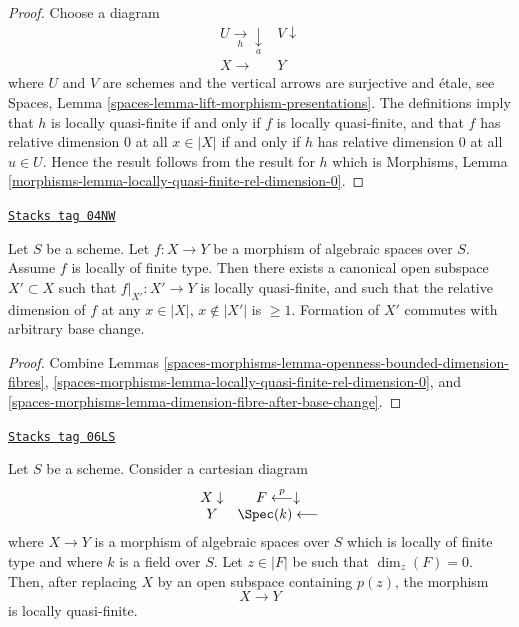 \begin{proof}
Choose a diagram
$$
\begin{array}{cc}U \underset{h}{\longrightarrow}\underset{a}{\downarrow} & V \downarrow \\ X \longrightarrow & Y\end{array}
$$
where $U$ and $V$ are schemes and the vertical arrows are surjective and
\'etale, see
Spaces, Lemma \ref{spaces-lemma-lift-morphism-presentations}.
The definitions imply that
$h$ is locally quasi-finite if and only if $f$ is locally quasi-finite,
and that $f$ has relative dimension $0$ at all $x \in |X|$ if and
only if $h$ has relative dimension $0$ at all $u \in U$.
Hence the result follows from the result for $h$ which is
Morphisms, Lemma \ref{morphisms-lemma-locally-quasi-finite-rel-dimension-0}.
\end{proof}

\begin{lemma}
\label{spaces-morphisms-lemma-locally-finite-type-quasi-finite-part}
\href{https://stacks.math.columbia.edu/tag/04NW}{\texttt{Stacks tag 04NW}}

Let $S$ be a scheme.
Let $f : X \to Y$ be a morphism of algebraic spaces over $S$.
Assume $f$ is locally of finite type.
Then there exists a canonical open subspace $X' \subset X$ such that
$f|_{X'} : X' \to Y$ is locally quasi-finite, and such that the
relative dimension of $f$ at any $x \in |X|$, $x \not \in |X'|$ is
$\geq 1$. Formation of $X'$ commutes with arbitrary base change.
\end{lemma}

\begin{proof}
Combine
Lemmas \ref{spaces-morphisms-lemma-openness-bounded-dimension-fibres},
\ref{spaces-morphisms-lemma-locally-quasi-finite-rel-dimension-0}, and
\ref{spaces-morphisms-lemma-dimension-fibre-after-base-change}.
\end{proof}

\begin{lemma}
\label{spaces-morphisms-lemma-quasi-finite-at-point}
\href{https://stacks.math.columbia.edu/tag/06LS}{\texttt{Stacks tag 06LS}}

Let $S$ be a scheme. Consider a cartesian diagram
$$
\begin{array}{cc}X \downarrow & F \overset{p}{\longleftarrow}\downarrow \\ Y & \Spec(k) \longleftarrow\end{array}
$$
where $X \to Y$ is a morphism of algebraic spaces over $S$ which is
locally of finite type and where $k$ is a field over $S$.
Let $z \in |F|$ be such that $\dim_z(F) = 0$. Then, after replacing $X$
by an open subspace containing $p(z)$, the morphism
$$
X \longrightarrow Y
$$
is locally quasi-finite.
\end{lemma}


